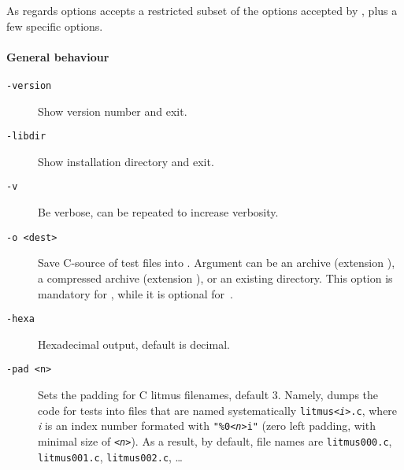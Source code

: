 As regards options  \klitmus{} accepts a restricted subset of the options
accepted by \litmus{}, plus a few specific options.

\paragraph*{General behaviour}

\begin{description}
\item[{\tt -version}] Show version number and exit.
\item[{\tt -libdir}] Show installation directory and exit.
\item[{\tt -v}] Be verbose, can be repeated to increase verbosity.
\item[{\tt -o <dest>}]
Save C-source of test files into .
Argument  can be an archive (extension ),
a compressed archive (extension ),
or an existing directory. This option is mandatory for \klitmus,
while it is optional for~\litmus.
\item[{\tt -hexa}] Hexadecimal output, default is decimal.
\item[{\tt -pad <n>}] Sets the padding for C litmus filenames, default 3.
Namely, \klitmus{} dumps the code for tests into files that
are named systematically \texttt{litmus\textit{<i>}.c}, where \textit{i} is
an index number formated with
\texttt{"\%0\textit{<n>}i"} (zero left padding,
with minimal size of  \texttt{\textit{<n>}}).
As a result, by default, file names are
\texttt{litmus000.c}, \texttt{litmus001.c}, \texttt{litmus002.c}, \ldots
\end{description}

\paragraph*{}

